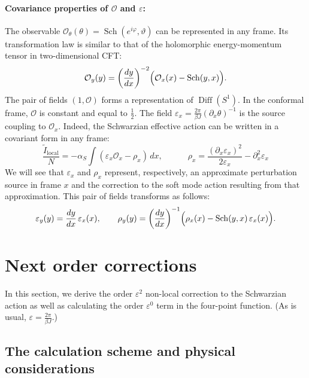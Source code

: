 \documentclass[12pt]{article}
\newcommand{\vth}{\vartheta}
\newcommand{\calO}{\mathcal{O}}
\DeclareMathOperator{\Diff}{Diff}
\DeclareMathOperator{\Sch}{Sch}
\newcommand{\loc}{\text{local}}
\newcommand{\tI}{\tilde{I}}
\newcommand{\OO}{\mathcal{O}}
\newcommand{\vep}{\varepsilon}
\newcommand{\vp}{\varphi}
\begin{document}
\paragraph{Covariance properties of $\calO$ and $\vep$:}
The observable $\OO_{\theta}(\theta)=\Sch(e^{i\vp},\vth)$ can be represented in any frame. Its transformation law is similar to that of the holomorphic energy-momentum tensor in two-dimensional CFT:
\begin{equation}
\OO_{y}(y)=\biggl(\frac{dy}{dx}\biggr)^{-2}\Bigl(\OO_{x}(x)-\Sch(y,x)\Bigr).
\end{equation}
The pair of fields $(1,\OO)$ forms a representation of $\Diff(S^1)$. In the conformal frame, $\OO$ is constant and equal to $\frac{1}{2}$. The field $\vep_x=\frac{2\pi}{\beta J}(\partial_x\theta)^{-1}$ is the source coupling to $\OO_x$. Indeed, the Schwarzian effective action can be written in a covariant form in any frame:
\begin{equation}\label{Iepsrho}
\frac{\tI_{\loc}}{N}
=-\alpha_S \int(\vep_x\OO_{x}-\rho_{x})\,dx,\qquad\quad
\rho_x=\frac{(\partial_x\vep_x)^2}{2\vep_x}-\partial_x^2\vep_x
\end{equation}
We will see that $\vep_x$ and $\rho_x$ represent, respectively, an approximate perturbation source in frame $x$ and the correction to the soft mode action resulting from that approximation. This pair of fields transforms as follows:
\begin{equation}
\vep_y(y)=\frac{dy}{dx}\,\vep_x(x),\qquad
\rho_y(y)=\biggl(\frac{dy}{dx}\biggr)^{-1}
\Bigl(\rho_{x}(x)-\Sch(y,x)\,\vep_x(x)\Bigr).
\end{equation}

\section{Next order corrections}\label{sec_next_order}

In this section, we derive the order $\vep^2$ non-local correction to the Schwarzian action as well as calculating the order $\vep^0$ term in the four-point function. (As is usual, $\vep=\frac{2\pi}{\beta J}$.)

\subsection{The calculation scheme and physical considerations}\label{sec_calc_scheme}
\end{document}
